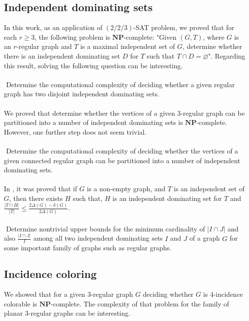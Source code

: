 \documentclass[
final
]{dmtcs-episciences}
\begin{document}
\subsection{Independent dominating sets}
In this work, as an application of $(2/2/3)$-SAT problem, we proved that for each $r\geq 3$, the following problem is $ \mathbf{NP} $-complete: "Given $(G,T)$, where $G$ is an $r$-regular graph and $T$ is  a  maximal independent set of $G$, determine whether
there is an independent dominating set $D$ for $T $ such that $  T \cap D =\varnothing $".
Regarding this result, solving the following question can be interesting.
\\ \\
\textbullet $ $   Determine the computational complexity of deciding whether a given  regular graph has two disjoint independent dominating sets.
\\ \\
We proved that determine  whether the vertices of a given  3-regular graph can be partitioned into a number of independent dominating sets is  $ \mathbf{NP} $-complete. However, one further step does not seem trivial.
\\ \\
\textbullet $  $ Determine the computational complexity of deciding whether  the vertices of a given  connected regular graph can be partitioned into a number of independent dominating sets.
\\ \\
In \cite{dehhh}, it was  proved that
if $G$ is a non-empty graph, and $T$ is an independent set of $G$, then there exists $H$ such that, $H$ is an independent dominating set for $T$ and
$ \frac{\vert T \cap H\vert}{ \vert T\vert}\leq \frac{2\Delta(G) -\delta(G) }{2\Delta(G)}$.
\\ \\
\textbullet $ $   Determine  nontrivial upper bounds for the minimum cardinality of $|I \cap J|$ and also $\frac{|I \cap J|}{I}$ among all  two  independent dominating sets $I$ and $J$ of a graph $G$ for some important family of graphs such as regular graphs.

\subsection{Incidence coloring}


We showed that for a given 3-regular graph $G$ deciding whether $G$ is 4-incidence colorable  is $ \mathbf{NP} $-complete. The complexity of that problem for the family of planar 3-regular graphs can be interesting.
\end{document}
